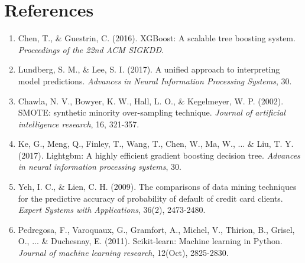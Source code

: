 \documentclass[12pt,a4paper]{article}
\begin{document}
\section{References}
\begin{enumerate}
    \item[1] Chen, T., \& Guestrin, C. (2016). XGBoost: A scalable tree boosting system. \textit{Proceedings of the 22nd ACM SIGKDD}.
    \item[2] Lundberg, S. M., \& Lee, S. I. (2017). A unified approach to interpreting model predictions. \textit{Advances in Neural Information Processing Systems}, 30.
    \item[3] Chawla, N. V., Bowyer, K. W., Hall, L. O., \& Kegelmeyer, W. P. (2002). SMOTE: synthetic minority over-sampling technique. \textit{Journal of artificial intelligence research}, 16, 321-357.
    \item[4] Ke, G., Meng, Q., Finley, T., Wang, T., Chen, W., Ma, W., ... \& Liu, T. Y. (2017). Lightgbm: A highly efficient gradient boosting decision tree. \textit{Advances in neural information processing systems}, 30.
    \item[5] Yeh, I. C., \& Lien, C. H. (2009). The comparisons of data mining techniques for the predictive accuracy of probability of default of credit card clients. \textit{Expert Systems with Applications}, 36(2), 2473-2480.
    \item[6] Pedregosa, F., Varoquaux, G., Gramfort, A., Michel, V., Thirion, B., Grisel, O., ... \& Duchesnay, E. (2011). Scikit-learn: Machine learning in Python. \textit{Journal of machine learning research}, 12(Oct), 2825-2830.
\end{enumerate}
\end{document}
